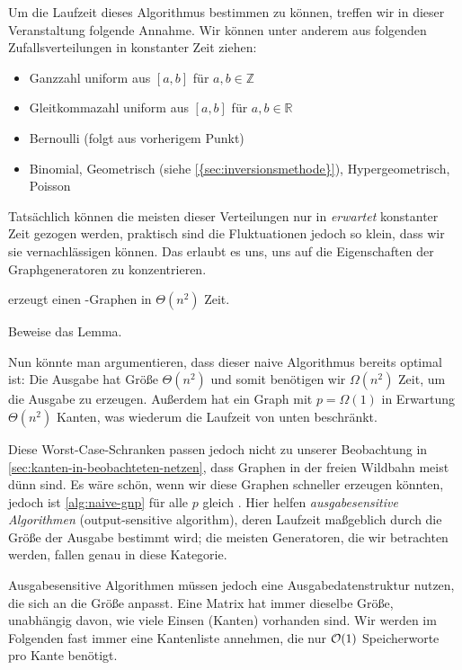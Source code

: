 Um  die Laufzeit dieses Algorithmus bestimmen zu können, treffen wir in dieser Veranstaltung folgende Annahme.
Wir können unter anderem aus folgenden Zufallsverteilungen in konstanter Zeit ziehen:
\begin{itemize}
    \item Ganzzahl uniform aus $[a, b]$ für $a, b \in \mathbb{Z}$
    \item Gleitkommazahl uniform aus $[a, b]$ für $a, b \in \mathbb{R}$
    \item Bernoulli (folgt aus vorherigem Punkt)
    \item Binomial, Geometrisch (siehe \cref{{sec:inversionsmethode}}), Hypergeometrisch, Poisson
\end{itemize}

Tatsächlich können die meisten dieser Verteilungen nur in \emph{erwartet} konstanter Zeit gezogen werden, praktisch sind die Fluktuationen jedoch so klein, dass wir sie vernachlässigen können.
Das erlaubt es uns, uns auf die Eigenschaften der Graphgeneratoren zu konzentrieren.

\begin{lemma}
    \label{lem:naive-gnp}
     erzeugt einen \Gnp-Graphen in $\Theta(n^2)$ Zeit.
\end{lemma}

\begin{exercise}
    Beweise das Lemma.
\end{exercise}

Nun könnte man argumentieren, dass dieser naive Algorithmus bereits optimal ist:
Die Ausgabe hat Größe $\Theta(n^2)$ und somit benötigen wir $\Omega(n^2)$ Zeit, um die Ausgabe zu erzeugen.
Außerdem hat ein Graph mit $p=\Omega(1)$ in Erwartung $\Theta(n^2)$ Kanten, was wiederum die Laufzeit von unten beschränkt.

Diese Worst-Case-Schranken passen jedoch nicht zu unserer Beobachtung in \cref{sec:kanten-in-beobachteten-netzen}, dass Graphen in der freien Wildbahn meist dünn sind.
Es wäre schön, wenn wir diese Graphen schneller erzeugen könnten, jedoch ist \cref{alg:naive-gnp} für alle $p$ gleich .
Hier  helfen \emph{ausgabesensitive Algorithmen} (output-sensitive algorithm), deren Laufzeit maßgeblich durch die Größe der Ausgabe bestimmt wird;
die meisten Generatoren, die wir betrachten werden, fallen genau in diese Kategorie.

Ausgabesensitive  Algorithmen müssen jedoch eine Ausgabedatenstruktur nutzen, die sich an die Größe anpasst.
Eine Matrix hat immer dieselbe Größe, unabhängig davon, wie viele Einsen (Kanten) vorhanden sind.
Wir werden im Folgenden fast immer eine Kantenliste annehmen, die nur $\mathcal{O}\!\left(1\right)$ Speicherworte pro Kante benötigt.

